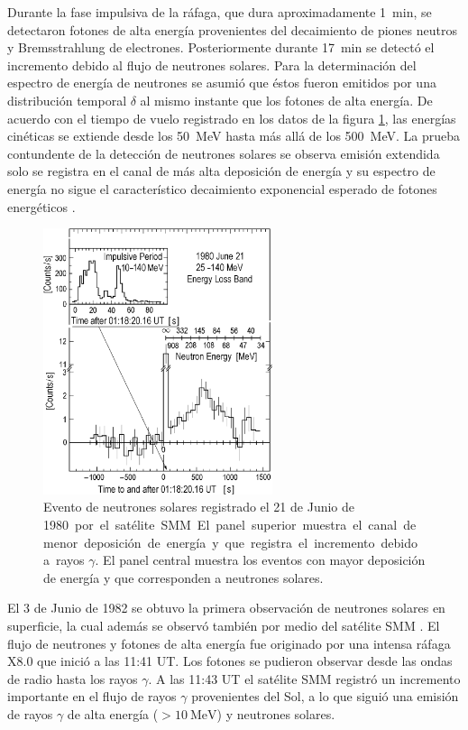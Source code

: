 Durante la fase impulsiva de la ráfaga, que dura aproximadamente \SI{1}{\minute}, se detectaron fotones de alta energía provenientes del decaimiento de piones neutros y Bremsstrahlung de electrones. Posteriormente durante \SI{17}{\minute} se detectó el incremento debido al flujo de neutrones solares. Para la determinación del espectro de energía de neutrones se asumió que éstos fueron emitidos por una distribución temporal $\delta$ al mismo instante que los fotones de alta energía. De acuerdo con el tiempo de vuelo registrado en los datos de la figura \ref{fig:solar-neutrons}, las energías cinéticas se extiende desde los \SI{50}{\mega\electronvolt} hasta más allá de los \SI{500}{\mega\electronvolt}. La prueba contundente de la detección de neutrones solares se observa emisión extendida solo se registra en el canal de más alta deposición de energía y su espectro de energía no sigue el característico decaimiento exponencial esperado de fotones energéticos \cite{dorman}.

\begin{figure}
        \centering
        \includegraphics[width=0.6\textwidth]{solar-neutrons.png}
        \caption{Evento de neutrones solares registrado el \num{21} de Junio de \SI{1980} por el satélite SMM. El panel superior muestra el canal de menor deposición de energía y que registra el incremento debido a rayos $\gamma$. El panel central muestra los eventos con mayor deposición de energía y que corresponden a neutrones solares.}
        \label{fig:solar-neutrons}
\end{figure}

El \num{3} de Junio de \num{1982} se obtuvo la primera observación de neutrones solares en superficie, la cual además se observó también por medio del satélite SMM \cite{debrunner83}. El flujo de neutrones y fotones de alta energía fue originado por una intensa ráfaga X8.0 que inició a las 11:41 UT. Los fotones se pudieron observar desde las ondas de radio hasta los rayos $\gamma$. A las 11:43 UT el satélite SMM registró un incremento importante en el flujo de rayos $\gamma$ provenientes del Sol, a lo que siguió una emisión de rayos $\gamma$ de alta energía ($>\SI{10}{\mega\electronvolt}$) y neutrones solares.

